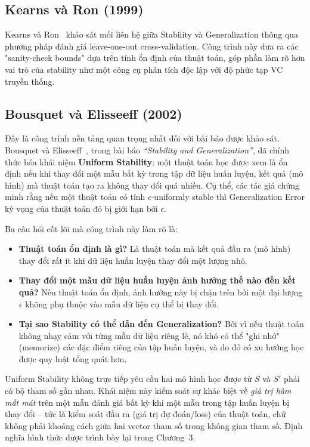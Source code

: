 \subsection{Kearns và Ron (1999)}

Kearns và Ron~\cite{kearns1999algorithmic} khảo sát mối liên hệ giữa Stability và Generalization thông qua phương pháp đánh giá leave-one-out cross-validation. Công trình này đưa ra các "sanity-check bounds" dựa trên tính ổn định của thuật toán, góp phần làm rõ hơn vai trò của stability như một công cụ phân tích độc lập với độ phức tạp VC truyền thống.

\subsection{Bousquet và Elisseeff (2002)}

Đây là công trình nền tảng quan trọng nhất đối với bài báo được khảo sát. Bousquet và Elisseeff~\cite{bousquet2002stability}, trong bài báo \textit{``Stability and Generalization''}, đã chính thức hóa khái niệm \textbf{Uniform Stability}: một thuật toán học được xem là ổn định nếu khi thay đổi một mẫu bất kỳ trong tập dữ liệu huấn luyện, kết quả (mô hình) mà thuật toán tạo ra không thay đổi quá nhiều. Cụ thể, các tác giả chứng minh rằng nếu một thuật toán có tính $\epsilon$-uniformly stable thì Generalization Error kỳ vọng của thuật toán đó bị giới hạn bởi $\epsilon$.

Ba câu hỏi cốt lõi mà công trình này làm rõ là:
\begin{itemize}
    \item \textbf{Thuật toán ổn định là gì?} Là thuật toán mà kết quả đầu ra (mô hình) thay đổi rất ít khi dữ liệu huấn luyện thay đổi một lượng nhỏ.
    \item \textbf{Thay đổi một mẫu dữ liệu huấn luyện ảnh hưởng thế nào đến kết quả?} Nếu thuật toán ổn định, ảnh hưởng này bị chặn trên bởi một đại lượng $\epsilon$ không phụ thuộc vào mẫu dữ liệu cụ thể bị thay đổi.
    \item \textbf{Tại sao Stability có thể dẫn đến Generalization?} Bởi vì nếu thuật toán không nhạy cảm với từng mẫu dữ liệu riêng lẻ, nó khó có thể "ghi nhớ" (memorize) các đặc điểm riêng của tập huấn luyện, và do đó có xu hướng học được quy luật tổng quát hơn.
\end{itemize}

Uniform Stability không trực tiếp yêu cầu hai mô hình học được từ $S$ và $S'$ phải có bộ tham số gần nhau. Khái niệm này kiểm soát sự khác biệt về \emph{giá trị hàm mất mát} trên một mẫu đánh giá bất kỳ khi một mẫu trong tập huấn luyện bị thay đổi -- tức là kiểm soát đầu ra (giá trị dự đoán/loss) của thuật toán, chứ không phải khoảng cách giữa hai vector tham số trong không gian tham số. Định nghĩa hình thức được trình bày lại trong Chương~3.

